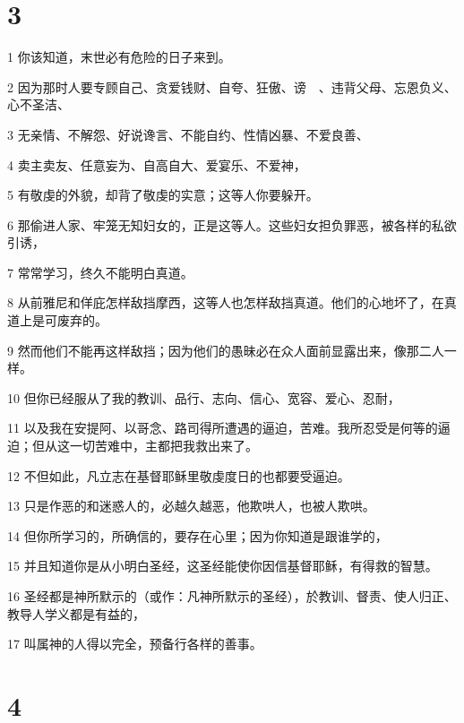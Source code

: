 \chapter{3}

\par 1 你该知道，末世必有危险的日子来到。
\par 2 因为那时人要专顾自己、贪爱钱财、自夸、狂傲、谤　、违背父母、忘恩负义、心不圣洁、
\par 3 无亲情、不解怨、好说谗言、不能自约、性情凶暴、不爱良善、
\par 4 卖主卖友、任意妄为、自高自大、爱宴乐、不爱神，
\par 5 有敬虔的外貌，却背了敬虔的实意；这等人你要躲开。
\par 6 那偷进人家、牢笼无知妇女的，正是这等人。这些妇女担负罪恶，被各样的私欲引诱，
\par 7 常常学习，终久不能明白真道。
\par 8 从前雅尼和佯庇怎样敌挡摩西，这等人也怎样敌挡真道。他们的心地坏了，在真道上是可废弃的。
\par 9 然而他们不能再这样敌挡；因为他们的愚昧必在众人面前显露出来，像那二人一样。
\par 10 但你已经服从了我的教训、品行、志向、信心、宽容、爱心、忍耐，
\par 11 以及我在安提阿、以哥念、路司得所遭遇的逼迫，苦难。我所忍受是何等的逼迫；但从这一切苦难中，主都把我救出来了。
\par 12 不但如此，凡立志在基督耶稣里敬虔度日的也都要受逼迫。
\par 13 只是作恶的和迷惑人的，必越久越恶，他欺哄人，也被人欺哄。
\par 14 但你所学习的，所确信的，要存在心里；因为你知道是跟谁学的，
\par 15 并且知道你是从小明白圣经，这圣经能使你因信基督耶稣，有得救的智慧。
\par 16 圣经都是神所默示的（或作：凡神所默示的圣经），於教训、督责、使人归正、教导人学义都是有益的，
\par 17 叫属神的人得以完全，预备行各样的善事。

\chapter{4}

